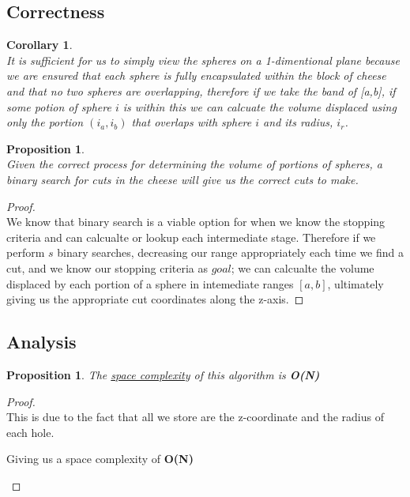 \documentclass[12pt]{article}
\newtheorem{corollary}[theorem]{Corollary}
\newtheorem{proposition}[theorem]{Proposition}
\begin{document}

\subsection{Correctness}
\begin{corollary}
~ \\ \indent It is sufficient for us to simply view the spheres on a 1-dimentional plane because we are
ensured that each sphere is fully encapsulated within the block of cheese and that no two spheres are
overlapping, therefore if we take the band of [a,b], if some potion of sphere $i$ is within this we can
calcuate the volume displaced using only the portion $(i_a, i_b)$ that overlaps with sphere $i$ and its
radius, $i_r$.
\end{corollary}
\begin{proposition}
~ \\ \indent Given the correct process for determining the volume of portions of spheres, a binary search
for cuts in the cheese will give us the correct cuts to make.
\end{proposition}

\begin{proof}
~ \\ \indent We know that binary search is a viable option for when we know the stopping criteria and
can calcualte or lookup each intermediate stage. Therefore if we perform $s$ binary searches, decreasing
our range appropriately each time we find a cut, and we know our stopping criteria as $goal$; we can
calcualte the volume displaced by each portion of a sphere in intemediate ranges $[a,b]$, ultimately
giving us the appropriate cut coordinates along the z-axis.
\end{proof}

\newpage
\subsection{Analysis}

\begin{proposition}
\label{numq}
The \underline{space complexity} of this algorithm is \textbf{O(N)}
\end{proposition}

\begin{proof}
~ \\ \indent This is due to the fact that all we store are the z-coordinate and the radius of
each hole.
\begin{center}
    Giving us a space complexity of \textbf{O(N)}
\end{center}
\end{proof}
\end{document}
